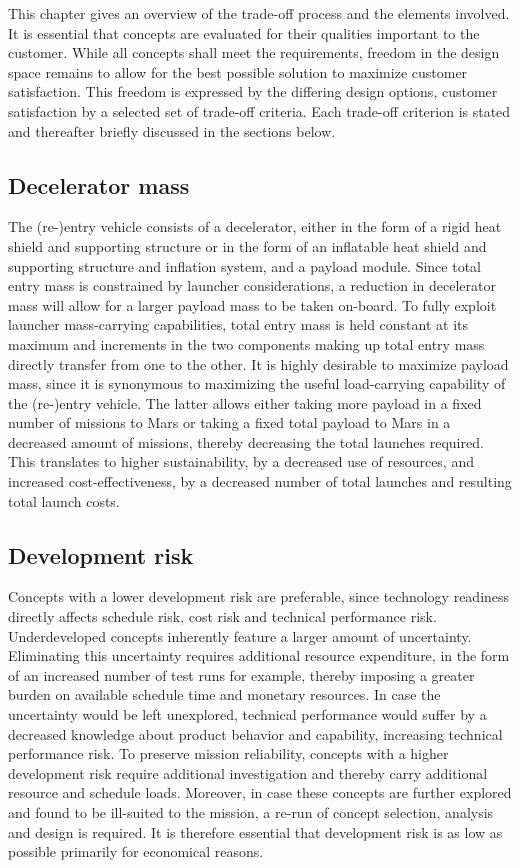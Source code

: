 \label{ch:tradeoff}
This chapter gives an overview of the trade-off process and the elements involved. It is essential that concepts are evaluated for their qualities important to the customer. While all concepts shall meet the requirements, freedom in the design space remains to allow for the best possible solution to maximize customer satisfaction. This freedom is expressed by the differing design options, customer satisfaction by a selected set of trade-off criteria. Each trade-off criterion is stated and thereafter briefly discussed in the sections below.

\subsection{Decelerator mass}\label{subsub:decelmass}
The (re-)entry vehicle consists of a decelerator, either in the form of a rigid heat shield and supporting structure or in the form of an inflatable heat shield and supporting structure and inflation system, and a payload module. Since total entry mass is constrained by launcher considerations, a reduction in decelerator mass will allow for a larger payload mass to be taken on-board. To fully exploit launcher mass-carrying capabilities, total entry mass is held constant at its maximum and increments in the two components making up total entry mass directly transfer from one to the other. It is highly desirable to maximize payload mass, since it is synonymous to maximizing the useful load-carrying capability of the (re-)entry vehicle. The latter allows either taking more payload in a fixed number of missions to Mars or taking a fixed total payload to Mars in a decreased amount of missions, thereby decreasing the total launches required. This translates to higher sustainability, by a decreased use of resources, and increased cost-effectiveness, by a decreased number of total launches and resulting total launch costs.

\subsection{Development risk}
Concepts with a lower development risk are preferable, since technology readiness directly affects schedule risk, cost risk and technical performance risk. Underdeveloped concepts inherently feature a larger amount of uncertainty. Eliminating this uncertainty requires additional resource expenditure, in the form of an increased number of test runs for example, thereby imposing a greater burden on available schedule time and monetary resources. In case the uncertainty would be left unexplored, technical performance would suffer by a decreased knowledge about product behavior and capability, increasing technical performance risk. To preserve mission reliability, concepts with a higher development risk require additional investigation and thereby carry additional resource and schedule loads. Moreover, in case these concepts are further explored and found to be ill-suited to the mission, a re-run of concept selection, analysis and design is required. It is therefore essential that development risk is as low as possible primarily for economical reasons.

